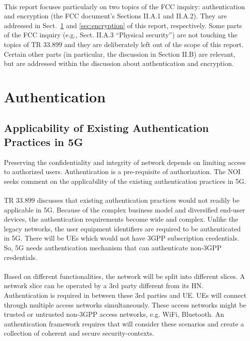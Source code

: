 \documentclass[lnicst,sechang,a4paper]{svmultln}
\begin{document}
\paragraph{}
This report focuses particularly on two topics of the FCC inquiry: authentication and encryption (the FCC document's Sections II.A.1 and II.A.2). They are addressed in Sect.~\ref{sec:authentication} and \ref{sec:encryption} of this report, respectively. Some parts of the FCC inquiry (e.g., Sect. II.A.3 ``Physical security'') are not touching the topics of TR 33.899 and they are deliberately left out of the scope of this report. Certain other parts (in particular, the discussion in Section II.B) are relevant, but are addressed within the discussion about authentication and encryption.

\section{Authentication}
\label{sec:authentication}
\subsection{Applicability of Existing Authentication Practices in 5G}
Preserving the confidentiality and integrity of network depends on limiting access to authorized users. Authentication is a pre-requisite of authorization. The NOI seeks comment on the applicability of the existing authentication practices in 5G.
\paragraph{}
TR 33.899 discusses that existing authentication practices would not readily be applicable in 5G. Because of the complex business model and diversified end-user devices, the authentication requirements become wide and complex. Unlike the legacy networks, the user equipment identifiers are required to be authenticated in 5G. There will be UEs which would not have 3GPP subscription credentials. So, 5G needs authentication mechanism that can authenticate non-3GPP credentials. 
\paragraph{}
Based on different functionalities, the network will be split into different slices. A network slice can be operated by a 3rd party different from its HN. Authentication is required in between these 3rd parties and UE. UEs will connect through multiple access networks simultaneously. These access networks might be trusted or untrusted non-3GPP access networks, e.g. WiFi, Bluetooth. An authentication framework requires that will consider these scenarios and create a collection of coherent and secure security-contexts.
\end{document}
